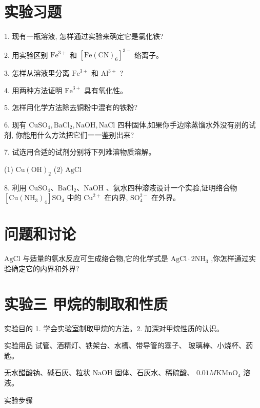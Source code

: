 \documentclass[10pt]{article}
\begin{document}
\section*{实验习题}

1. 现有一瓶溶液, 怎样通过实验来确定它是氯化铁?

2. 用实验区别 \({\mathrm{{Fe}}}^{3 + }\) 和 \({\left\lbrack \mathrm{{Fe}}{\left( \mathrm{{CN}}\right) }_{6}\right\rbrack }^{3 - }\) 络离子。

3. 怎样从溶液里分离 \({\mathrm{{Fe}}}^{3 + }\) 和 \({\mathrm{{Al}}}^{3 + }\) ?

4. 用两种方法证明 \({\mathrm{{Fe}}}^{3 + }\) 具有氧化性。

5. 怎样用化学方法除去铜粉中混有的铁粉?

6. 现有 \({\mathrm{{CuSO}}}_{4},{\mathrm{{BaCl}}}_{2},\mathrm{{NaOH}},\mathrm{{NaCl}}\) 四种固体,如果你手边除蒸馏水外没有别的试剂, 你能用什么方法把它们一一鉴别出来?

7. 试选用合适的试剂分别将下列难溶物质溶解。

(1) \(\mathrm{{Cu}}{\left( \mathrm{{OH}}\right) }_{2}\) (2) \(\mathrm{{AgCl}}\)

8. 利用 \({\mathrm{{CuSO}}}_{4}\text{、}{\mathrm{{BaCl}}}_{2}\text{、}\mathrm{{NaOH}}\) 、氨水四种溶液设计一个实验,证明络合物 \(\left\lbrack {\mathrm{{Cu}}{\left( {\mathrm{{NH}}}_{3}\right) }_{4}}\right\rbrack {\mathrm{{SO}}}_{4}\) 中的 \({\mathrm{{Cu}}}^{2 + }\) 在内界, \({\mathrm{{SO}}}_{4}^{2 - }\) 在外界。

\section*{问题和讨论}

\(\mathrm{{AgCl}}\) 与适量的氨水反应可生成络合物,它的化学式是 \(\mathrm{{AgCl}} \cdot 2{\mathrm{{NH}}}_{3}\) ,你怎样通过实验确定它的内界和外界?

\section*{实验三 甲烷的制取和性质}

实验目的 1. 学会实验室制取甲烷的方法。2. 加深对甲烷性质的认识。

实验用品 试管、酒精灯、铁架台、水槽、带导管的塞子、 玻璃棒、小烧杯、药匙。

无水醋酸钠、碱石灰、粒状 \(\mathrm{{NaOH}}\) 固体、石灰水、稀硫酸、 \({0.01M}{\mathrm{{KMnO}}}_{4}\) 溶液。

实验步骤
\end{document}
